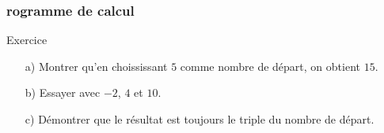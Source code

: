 \documentclass{beamer}
\begin{document}
\begin{frame}
  \frametitle{rogramme de calcul}
  \begin{exampleblock}{Exercice}
    
    \begin{multicols}{2}
      
      \begin{enumerate}
      \item[a)] Montrer qu'en choississant $5$ comme nombre de départ, on obtient $15$.
      \item[b)] Essayer avec $-2$, $4$ et $10$.
      \item[c)] Démontrer que le résultat est toujours le triple du nombre de départ.
      \end{enumerate}
      
    \end{multicols}
    

  \end{exampleblock}
\end{frame}
\end{document}
